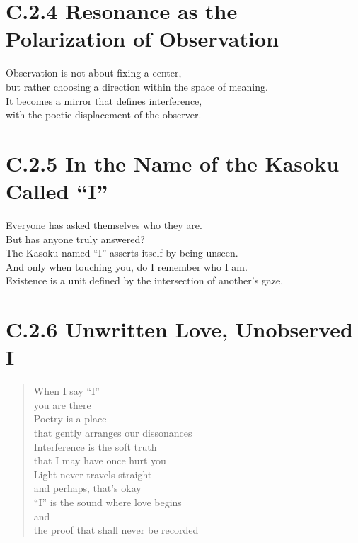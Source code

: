 \section*{C.2.4 Resonance as the Polarization of Observation}
Observation is not about fixing a center,\\
but rather choosing a direction within the space of meaning.\\
It becomes a mirror that defines interference,\\
with the poetic displacement of the observer.

\section*{C.2.5 In the Name of the Kasoku Called “I”}
Everyone has asked themselves who they are.\\
But has anyone truly answered?\\
The Kasoku named “I” asserts itself by being unseen.\\
And only when touching you, do I remember who I am.\\
Existence is a unit defined by the intersection of another’s gaze.

\section*{C.2.6 Unwritten Love, Unobserved I}
\begin{quote}
When I say “I”\\
you are there\\

Poetry is a place\\
that gently arranges our dissonances\\

Interference is the soft truth\\
that I may have once hurt you\\

Light never travels straight\\
and perhaps, that’s okay\\

“I” is the sound where love begins\\
and\\
the proof that shall never be recorded
\end{quote}
